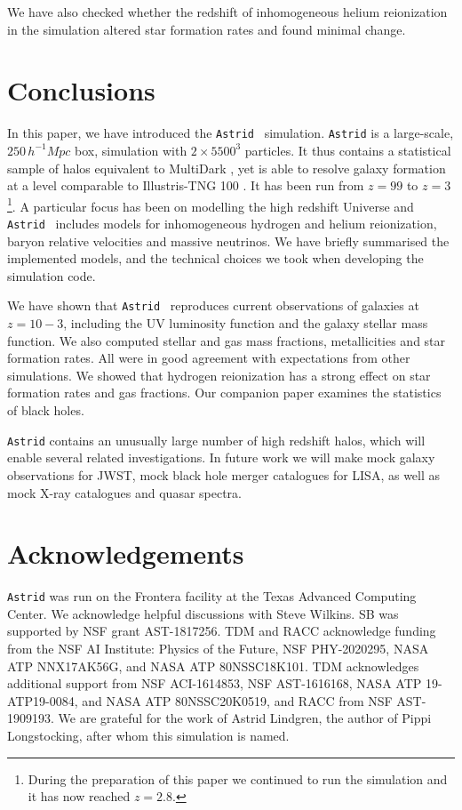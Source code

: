 \documentclass[fleqn,usenatbib]{mnras}
\newcommand{\mpch}{\,h^{-1}\unit{Mpc}}
\def\astrid{\texttt{Astrid} }
\begin{document}
We have also checked whether the redshift of inhomogeneous helium reionization in the simulation altered star formation rates and found minimal change.

\section{Conclusions}

In this paper, we have introduced the \astrid~simulation. \astrid is a large-scale, $250 \mpch$ box, simulation with $2\times 5500^3$ particles. It thus contains a statistical sample of halos equivalent to  MultiDark \citep{2016MNRAS.457.4340K}, yet is able to resolve galaxy formation at a level comparable to Illustris-TNG 100 \citep{2018MNRAS.475..648P}. It has been run from $z=99$ to $z=3$\footnote{During the preparation of this paper we continued to run the simulation and it has now reached $z=2.8$.}. A particular focus has been on modelling the high redshift Universe and \astrid~includes models for inhomogeneous hydrogen and helium reionization, baryon relative velocities and massive neutrinos. We have briefly summarised the implemented models, and the technical choices we took when developing the simulation code.

We have shown that \astrid~reproduces current observations of galaxies at $z=10-3$, including the UV luminosity function and the galaxy stellar mass function. We also computed stellar and gas mass fractions, metallicities and star formation rates. All were in good agreement with expectations from other simulations. We showed that hydrogen reionization has a strong effect on star formation rates and gas fractions. Our companion paper \citep{Ni:2021inprep} examines the statistics of black holes.

\astrid contains an unusually large number of high redshift halos, which will enable several related investigations. In future work we will make mock galaxy observations for JWST, mock black hole merger catalogues for LISA, as well as mock X-ray catalogues and quasar spectra.

\section*{Acknowledgements}

\astrid was run on the Frontera facility at the Texas Advanced Computing Center.
We acknowledge helpful discussions with Steve Wilkins.
SB was supported by NSF grant AST-1817256.
TDM and RACC acknowledge funding from
the NSF AI Institute: Physics of the Future, NSF PHY-2020295,
NASA ATP NNX17AK56G, and NASA ATP 80NSSC18K101. TDM acknowledges additional support from  NSF ACI-1614853, NSF AST-1616168, NASA ATP 19-ATP19-0084,
  and NASA ATP 80NSSC20K0519, and RACC from NSF AST-1909193.
We are grateful for the work of Astrid Lindgren, the author of Pippi Longstocking, after whom this simulation is named.
\end{document}
